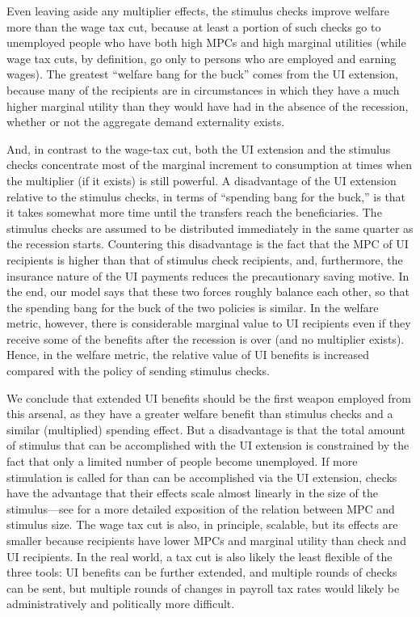 \documentclass[\econtexRoot/HAFiscal]{subfiles}
\begin{document}
Even leaving aside any multiplier effects, the stimulus checks improve welfare more than the wage tax cut, because at least a portion of such checks go to unemployed people who have both high MPCs and high marginal utilities (while wage tax cuts, by definition, go only to persons who are employed and earning wages). The greatest ``welfare bang for the buck'' comes from the UI extension, because many of the recipients are in circumstances in which they have a much higher marginal utility than they would have had in the absence of the recession, whether or not the aggregate demand externality exists.

And, in contrast to the wage-tax cut, both the UI extension and the stimulus checks concentrate most of the marginal increment to consumption at times when the multiplier (if it exists) is still powerful.  A disadvantage of the UI extension relative to the stimulus checks, in terms of ``spending bang for the buck,'' is that it takes somewhat more time until the transfers reach the beneficiaries. The stimulus checks are assumed to be distributed immediately in the same quarter as the recession starts. Countering this disadvantage is the fact that the MPC of UI recipients is higher than that of stimulus check recipients, and, furthermore, the insurance nature of the UI payments reduces the precautionary saving motive. In the end, our model says that these two forces roughly balance each other, so that the spending bang for the buck of the two policies is similar. In the welfare metric, however, there is considerable marginal value to UI recipients even if they receive some of the benefits after the recession is over (and no multiplier exists). Hence, in the welfare metric, the relative value of UI benefits is increased compared with the policy of sending stimulus checks.

We conclude that extended UI benefits should be the first weapon employed from this arsenal, as they have a greater welfare benefit than stimulus checks and a similar (multiplied) spending effect.  But a disadvantage is that the total amount of stimulus that can be accomplished with the UI extension is constrained by the fact that only a limited number of people become unemployed.  If more stimulation is called for than can be accomplished via the UI extension, checks have the advantage that their effects scale almost linearly in the size of the stimulus---see \cite{beraja2023size} for a more detailed exposition of the relation between MPC and stimulus size.  The wage tax cut is also, in principle, scalable, but its effects are smaller because recipients have lower MPCs and marginal utility than check and UI recipients.  In the real world, a tax cut is also likely the least flexible of the three tools:  UI benefits can be further extended, and multiple rounds of checks can be sent, but multiple rounds of changes in payroll tax rates would likely be administratively and politically more difficult.
\end{document}
